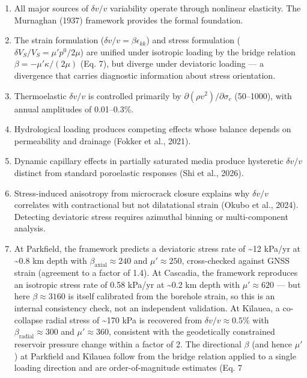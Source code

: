 \documentclass[draft]{agujournal2019}
\providecommand{\tightlist}{%
  \setlength{\itemsep}{0pt}\setlength{\parskip}{0pt}}
\begin{document}
\begin{enumerate}
\def\labelenumi{\arabic{enumi}.}
\tightlist
\item
  All major sources of \(\delta v/v\) variability operate through
  nonlinear elasticity. The Murnaghan (1937) framework provides the
  formal foundation.
\item
  The strain formulation (\(\delta v/v = \beta \epsilon_{kk}\)) and
  stress formulation (\(\delta V_S/V_S = \mu' p^0 / 2\mu\)) are unified
  under isotropic loading by the bridge relation
  \(\beta = -\mu'\kappa/(2\mu)\) (Eq. 7), but diverge under deviatoric
  loading --- a divergence that carries diagnostic information about
  stress orientation.
\item
  Thermoelastic \(\delta v/v\) is controlled primarily by
  \(\partial(\rho v^2)/\partial\sigma_c\) (50--1000), with annual
  amplitudes of 0.01--0.3\%.
\item
  Hydrological loading produces competing effects whose balance depends
  on permeability and drainage (Fokker et al., 2021).
\item
  Dynamic capillary effects in partially saturated media produce
  hysteretic \(\delta v/v\) distinct from standard poroelastic responses
  (Shi et al., 2026).
\item
  Stress-induced anisotropy from microcrack closure explains why
  \(\delta v/v\) correlates with contractional but not dilatational
  strain (Okubo et al., 2024). Detecting deviatoric stress requires
  azimuthal binning or multi-component analysis.
\item
  At Parkfield, the framework predicts a deviatoric stress rate of
  \textasciitilde12 kPa/yr at \textasciitilde0.8 km depth with
  \(\beta_{\text{axial}} \approx 240\) and \(\mu' \approx 250\),
  cross-checked against GNSS strain (agreement to a factor of 1.4). At
  Cascadia, the framework reproduces an isotropic stress rate of 0.58
  kPa/yr at \textasciitilde0.2 km depth with \(\mu' \approx 620\) ---
  but here \(\beta \approx 3160\) is itself calibrated from the borehole
  strain, so this is an internal consistency check, not an independent
  validation. At Kīlauea, a co-collapse radial stress of
  \textasciitilde170 kPa is recovered from \(\delta v/v \approx 0.5\%\)
  with \(\beta_{\text{radial}} \approx 300\) and \(\mu' \approx 360\),
  consistent with the geodetically constrained reservoir pressure change
  within a factor of 2. The directional \(\beta\) (and hence \(\mu'\))
  at Parkfield and Kīlauea follow from the bridge relation applied to a
  single loading direction and are order-of-magnitude estimates (Eq. 7

\end{enumerate}
\end{document}
